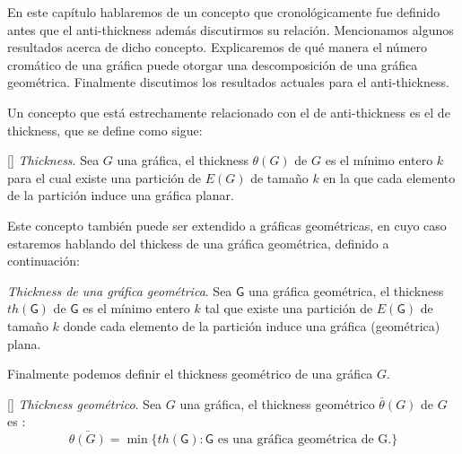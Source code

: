

En este capítulo hablaremos de un concepto que cronológicamente fue definido antes
que el anti-thickness además discutirmos su relación. Mencionamos algunos resultados acerca
de dicho concepto. Explicaremos de qué manera el número cromático de una
gráfica puede otorgar una descomposición de una gráfica geométrica. Finalmente
discutimos los resultados actuales para el anti-thickness.

Un concepto que está estrechamente relacionado con el de anti-thickness es el
de thickness, que se define como sigue:
\begin{definition}{[\cite{Dillencourt2004}] \emph{Thickness}.}
  Sea $G$ una gráfica, el thickness $\theta(G)$ de $G$ es el mínimo entero $k$
  para el cual existe una partición de $E(G)$ de tamaño $k$ en la que cada
  elemento de la partición induce una gráfica planar.
\end{definition}
Este concepto también puede ser extendido a gráficas geométricas, en cuyo caso
estaremos hablando del thickess de una gráfica geométrica, definido a continuación:
\begin{definition}{\emph{Thickness de una gráfica geométrica}.}
  Sea $\mathsf{G}$ una gráfica geométrica, el thickness $th(\mathsf{G})$
  de $\mathsf{G}$ es el mínimo entero $k$ tal que existe una partición de $E(\mathsf{G})$
  de tamaño $k$ donde cada elemento de la partición induce una
  gráfica (geométrica) plana.
\end{definition}
Finalmente podemos definir el thickness geométrico de una gráfica $G$.
\begin{definition}{[\cite{Dillencourt2004}] \emph{Thickness geométrico}.}
  Sea $G$ una gráfica, el thickness geométrico $\bar{\theta}(G)$ de $G$
  es : \[ \bar{\theta(G)} = \min\{th(\mathsf{G}): \mathsf{G} \text{ es una gráfica geométrica de G.} \} \]
\end{definition}



